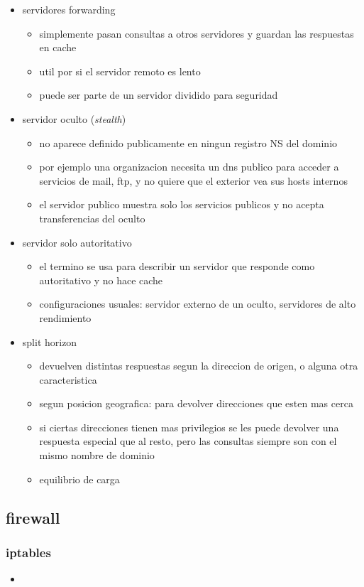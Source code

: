 \documentclass[11pt]{article}
\begin{document}
\begin{itemize}
\item servidores forwarding
\begin{itemize}
\item simplemente pasan consultas a otros servidores y guardan las respuestas en cache
\item util por si el servidor remoto es lento
\item puede ser parte de un servidor dividido para seguridad
\end{itemize}
\item servidor oculto (\emph{stealth})
\begin{itemize}
\item no aparece definido publicamente en ningun registro NS del dominio
\item por ejemplo una organizacion necesita un dns publico para acceder a servicios de mail, ftp, y no quiere que el exterior vea sus hosts internos
\item el servidor publico muestra solo los servicios publicos y no acepta transferencias del oculto
\end{itemize}
\item servidor solo autoritativo
\begin{itemize}
\item el termino se usa para describir un servidor que responde como autoritativo y no hace cache
\item configuraciones usuales: servidor externo de un oculto, servidores de alto rendimiento
\end{itemize}
\item split horizon
\begin{itemize}
\item devuelven distintas respuestas segun la direccion de origen, o alguna otra caracteristica
\item segun posicion geografica: para devolver direcciones que esten mas cerca
\item si ciertas direcciones tienen mas privilegios se les puede devolver una respuesta especial que al resto, pero las consultas siempre son con el mismo nombre de dominio
\item equilibrio de carga
\end{itemize}
\end{itemize}
\subsection{firewall}
\label{sec:orgb052e53}
\subsubsection{iptables}
\label{sec:org9d16455}
\begin{itemize}
\item 
\end{itemize}
\end{document}

